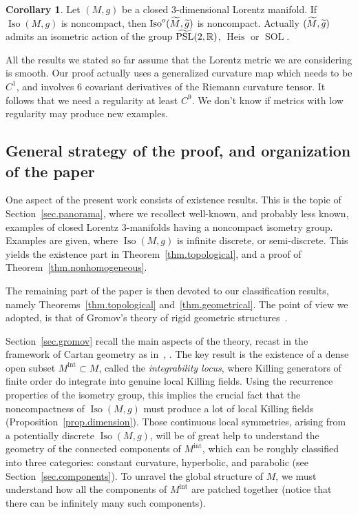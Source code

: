 \documentclass[11pt]{article}
\theoremstyle{definition}
\numberwithin{equation}{section}
\numberwithin{figure}{section}
\numberwithin{table}{section}
\newtheorem{corox}[thmx]{Corollary}
\DeclareMathOperator{\Iso}{Iso}
\DeclareMathOperator{\PSL}{PSL}
\DeclareMathOperator{\Sol}{SOL}
\newcommand{\mint}{{M^{\intl}}}
\DeclareMathOperator{\intl}{int}
\DeclareMathOperator{\Heis}{Heis}
\newcommand{\tm}{\tilde{{M}}}
\newcommand*\RR{\mathbb{R}}
\let\oldtilde\tilde
\renewcommand*\tilde[1]{\mathchoice{\widetilde{#1}}{\widetilde{#1}}{\widetilde{#1}}{\oldtilde{#1}}}
\begin{document}
\begin{corox}\label{coro.action.universel}
Let $(M,g)$ be a closed $3$-dimensional Lorentz manifold. If $\Iso(M,g)$ is noncompact, then $\Iso^o(\tm,\tilde{g})$ is noncompact. Actually $(\tm,\tilde{g})$ admits an isometric action of the group $\tilde{\PSL}(2,\RR)$, $\Heis$ or $\Sol$.
\end{corox}

All the results we stated so far assume that the Lorentz metric we are considering is smooth. Our proof actually uses a generalized curvature map which needs to be $C^1$, and involves 6 covariant derivatives of the Riemann curvature tensor. It follows that we need a regularity at least $C^9$. We don't know if metrics with low regularity may produce new examples.


\subsection{General strategy of the proof, and organization of the paper}

One aspect of the present work consists of existence results. This is the topic of Section~\ref{sec.panorama}, where we recollect well-known, and probably less known, examples of closed Lorentz $3$-manifolds having a noncompact isometry group. Examples are given, where $\Iso(M,g)$ is infinite discrete, or semi-discrete. This yields the existence part in Theorem~\ref{thm.topological}, and a proof of Theorem~\ref{thm.nonhomogeneous}.

The remaining part of the paper is then devoted to our classification results, namely Theorems~\ref{thm.topological} and~\ref{thm.geometrical}. The point of view we adopted, is that of Gromov's theory of rigid geometric structures~\cite{gromov}.

Section~\ref{sec.gromov} recall the main aspects of the theory, recast in the framework of Cartan geometry as in~\cite{melnick}, \cite{vincent}. The key result is the existence of a dense open subset $\mint \subset M$, called the \emph{integrability locus}, where Killing generators of finite order do integrate into genuine local Killing fields. Using the recurrence properties of the isometry group, this implies the crucial fact that the noncompactness of $\Iso(M,g)$ must produce a lot of local Killing fields (Proposition~\ref{prop.dimension}). Those continuous local symmetries, arising from a potentially discrete $\Iso(M,g)$, will be of great help to understand the geometry of the connected components of $\mint$, which can be roughly classified into three categories: constant curvature, hyperbolic, and parabolic (see Section~\ref{sec.components}). To unravel the global structure of $M$, we must understand how all the components of $\mint$ are patched together (notice that there can be infinitely many such components).
\end{document}

